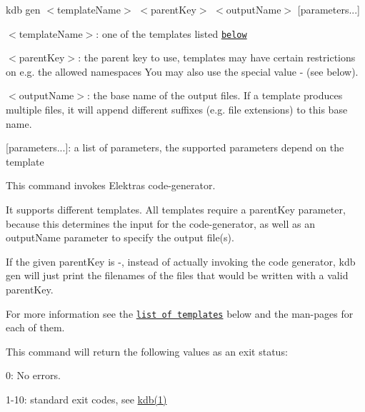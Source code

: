 {\ttfamily kdb gen $<$template\+Name$>$ $<$parent\+Key$>$ $<$output\+Name$>$ \mbox{[}parameters...\mbox{]}}


\begin{DoxyItemize}
\item {\ttfamily $<$template\+Name$>$}\+: one of the templates listed \href{#templates}{\tt below}
\item {\ttfamily $<$parent\+Key$>$}\+: the parent key to use, templates may have certain restrictions on e.\+g. the allowed namespaces You may also use the special value {\ttfamily -\/} (see below).
\item {\ttfamily $<$output\+Name$>$}\+: the base name of the output files. If a template produces multiple files, it will append different suffixes (e.\+g. file extensions) to this base name.
\item {\ttfamily \mbox{[}parameters...\mbox{]}}\+: a list of parameters, the supported parameters depend on the template
\end{DoxyItemize}

This command invokes Elektra\textquotesingle{}s code-\/generator.

It supports different templates. All templates require a {\ttfamily parent\+Key} parameter, because this determines the input for the code-\/generator, as well as an {\ttfamily output\+Name} parameter to specify the output file(s).

If the given {\ttfamily parent\+Key} is {\ttfamily -\/}, instead of actually invoking the code generator, {\ttfamily kdb gen} will just print the filenames of the files that would be written with a valid {\ttfamily parent\+Key}.

For more information see the \href{#templates}{\tt list of templates} below and the man-\/pages for each of them.

This command will return the following values as an exit status\+:


\begin{DoxyItemize}
\item 0\+: No errors.
\item 1-\/10\+: standard exit codes, see \hyperlink{doc_help_kdb_md}{kdb(1)}
\end{DoxyItemize}


